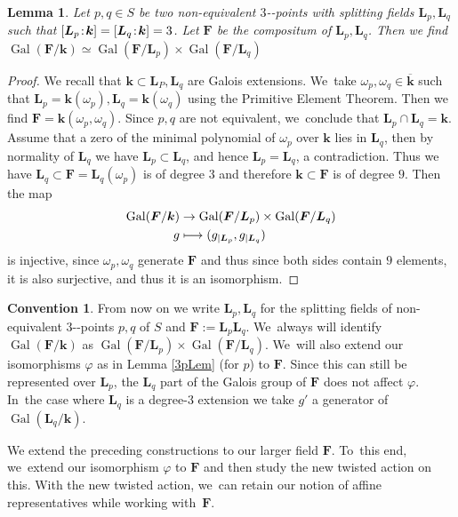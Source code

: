 \documentclass[10pt,a4paper]{amsart}
\providecommand{\nobreakdash}{\nobreak\hbox{-}}
\providecommand{\Bar}{\overline}
\newcommand\mto{\mathchoice{\longmapsto}{\mapsto}{\mapsto}{\mapsto}}
\newcommand{\sep}{\mkern2mu{:}\mkern2mu}
\DeclareMathOperator{\Gal}{Gal}
\newtheorem{lemma}[theorem]{Lemma}
\theoremstyle{definition}
\newtheorem{convention}[theorem]{Convention}
\newcommand{\kk}{{\boldsymbol{k}}}
\newcommand{\FF}{{\boldsymbol{F}}}
\newcommand{\LL}{{\boldsymbol{L}}}
\begin{document}
\begin{lemma}
Let $p,q \in S$ be two non-equivalent $3$\nobreakdash-points with splitting fields $\LL_p, \LL_q$ such that $ [\LL_p\sep \kk] = [\LL_q\sep \kk]=3$. Let $\FF$ be the compositum of $\LL_p, \LL_q$. Then we find $\Gal(\FF/\kk) \simeq \Gal(\FF/\LL_p) \times \Gal(\FF/\LL_q)$
\end{lemma}

\begin{proof}
We recall that $\kk \subset \LL_P, \LL_q$ are Galois extensions. We~take $\omega_p, \omega_q \in \Bar{\kk}$ such that $\LL_p = \kk(\omega_p), \LL_q = \kk(\omega_q)$ using the Primitive Element Theorem. Then we find $\FF = \kk(\omega_p,\omega_q)$. Since $p,q$ are not equivalent, we~conclude that $\LL_p \cap \LL_q = \kk$. Assume that a zero of the minimal polynomial of $\omega_p$ over $\kk$ lies in $\LL_q$, then by normality of $\LL_q$ we have $\LL_p \subset \LL_q$, and hence $\LL_p = \LL_q$, a contradiction. Thus we have $\LL_q \subset \FF = \LL_q(\omega_p)$ is of degree $3$ and therefore $\kk \subset \FF$ is of degree $9$. Then the map
\begin{align*}
\Gal(\FF/\kk) &\to \Gal(\FF/\LL_p) \times \Gal(\FF/\LL_q)
\\
g &\mto (g_{|\LL_p}, g_{|\LL_q})
\end{align*}
is injective, since $\omega_p, \omega_q$ generate $\FF$ and thus since both sides contain $9$ elements, it is also surjective, and thus it is an isomorphism.
\end{proof}

\begin{convention} \label{con:2SF}
From now on we write $\LL_p, \LL_q$ for the splitting fields of non-equivalent $3$\nobreakdash-points $p,q$ of $S$ and $\FF := \LL_p\LL_q$. We~always will identify $\Gal(\FF/\kk) $ as $\Gal(\FF/\LL_p) \times \Gal(\FF/\LL_q)$. We~will also extend our isomorphisms $\varphi$ as in Lemma \ref{3pLem} (for $p$) to $\FF$. Since this can still be represented over $\LL_p$, the $\LL_q$ part of the Galois group of $\FF$ does not affect $\varphi$. In~the case where $\LL_q$ is a degree-$3$ extension we take $g'$ a generator of $\Gal(\LL_q/\kk)$.
\end{convention}
We extend the preceding constructions to our larger field $\FF$. To~this end, we~extend our isomorphism $\varphi$ to $\FF$ and then study the new twisted action on this. With the new twisted action, we~can retain our notion of affine representatives while working with~$\FF$.
\end{document}
